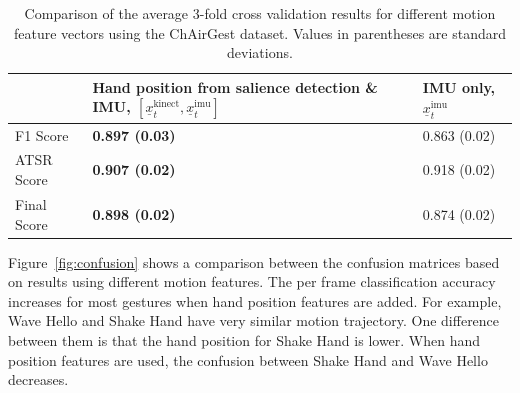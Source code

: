 \begin{table}[tbh]
\begin{center}
\begin{tabular}{|l|p{6cm}|p{4cm}|}
\hline
 & Hand position from salience detection \& IMU,
 $[\underline{x}^\text{kinect}_t, \underline{x}^\text{imu}_t]$ & IMU only, $\underline{x}^\text{imu}_t$ \\
\hline
F1 Score & \textbf{0.897 (0.03)} & 0.863 (0.02) \\
\hline
ATSR Score & \textbf{0.907 (0.02)}  & 0.918 (0.02) \\
\hline
Final Score & \textbf{0.898 (0.02)}  & 0.874 (0.02) \\
\hline
\end{tabular}
\caption{Comparison of the average 3-fold cross validation results for different
motion feature vectors using the ChAirGest dataset. Values in parentheses are
standard deviations.}
\label{tab:comp-motion-feature}
\end{center}
\end{table}

Figure~\ref{fig:confusion} shows a comparison between the confusion matrices
based on results using different motion features. The per frame classification
accuracy increases for most gestures when hand position features are added. For
example, Wave Hello and Shake Hand have very similar motion trajectory. One
difference between them is that the hand position for Shake Hand is lower. When
hand position features are used, the confusion between Shake Hand and Wave Hello
decreases.

